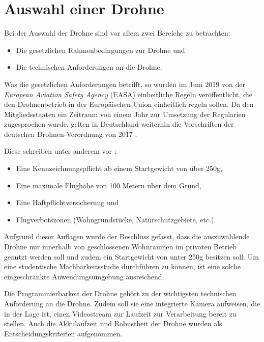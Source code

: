 \section{Auswahl einer Drohne} \label{drone_selection}

Bei der Auswahl der Drohne sind vor allem zwei Bereiche zu betrachten:

\begin{itemize}
	\item Die gesetzlichen Rahmenbedingungen zur Drohne und
	\item Die technischen Anforderungen an die Drohne.
\end{itemize}

Was die gesetzlichen Anforderungen betrifft, so wurden im Juni 2019 von der \textit{European Aviation Safety Agency} (EASA) einheitliche Regeln veröffentlicht, die den Drohnenbetrieb in der Europäischen Union einheitlich regeln sollen. Da den Mitgliedsstaaten ein Zeitraum von einem Jahr zur Umsetzung der Regularien zugesprochen wurde, gelten in Deutschland weiterhin die Vorschriften der deutschen Drohnen-Verordnung von 2017 \cite{EASA.2019}.

Diese schreiben unter anderem vor \cite{Drohnen.de.2020}:
\begin{itemize}
	\item Eine Kennzeichnungspflicht ab einem Startgewicht von über 250g,
	\item Eine maximale Flughöhe von 100 Metern über dem Grund,
	\item Eine Haftpflichtversicherung und
	\item Flugverbotszonen (Wohngrundstücke, Naturschutzgebiete, etc.).
\end{itemize}

Aufgrund dieser Auflagen wurde der Beschluss gefasst, dass die auszuwählende Drohne nur innerhalb von geschlossenen Wohnräumen im privaten Betrieb genutzt werden soll und zudem ein Startgewicht von unter 250g besitzen soll. Um eine studentische Machbarkeitsstudie durchführen zu können, ist eine solche eingeschränkte Anwendungsumgebung ausreichend. 

Die Programmierbarkeit der Drohne gehört zu der wichtigsten technischen Anforderung an die Drohne. Zudem soll sie eine integrierte Kamera aufweisen, die in der Lage ist, einen Videostream zur Laufzeit zur Verarbeitung bereit zu stellen. Auch die Akkulaufzeit und Robustheit der Drohne wurden als Entscheidungskriterien aufgenommen.

